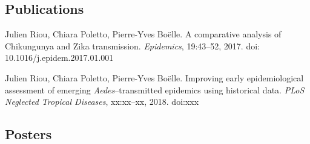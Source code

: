\subsection*{Publications}

\noindent Julien Riou, Chiara Poletto, Pierre-Yves Boëlle. A comparative analysis of Chikungunya and Zika transmission. {\em Epidemics}, 19:43--52, 2017. doi: 10.1016/j.epidem.2017.01.001 

\vspace{1.5em}

\noindent Julien Riou, Chiara Poletto, Pierre-Yves Boëlle. Improving early epidemiological assessment of emerging {\em Aedes}--transmitted epidemics using historical data. {\em PLoS Neglected Tropical Diseases}, xx:xx--xx, 2018. doi:xxx

\subsection*{Posters}





